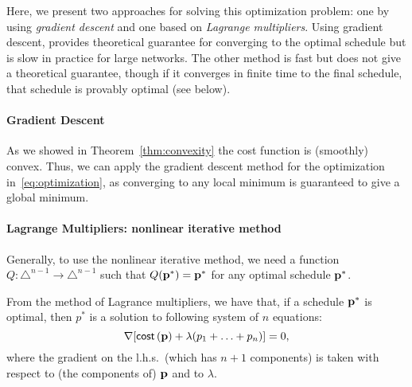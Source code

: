 Here, we present two approaches for solving this optimization problem: one by
using \emph{gradient descent} and one based on \emph{Lagrange multipliers}.
Using gradient descent, provides theoretical guarantee for converging to the
optimal schedule but is slow in practice for large networks. The other method is
fast but does not give a theoretical guarantee, though if it converges in finite
time to the final schedule, that schedule is provably optimal (see below).




\paragraph{Gradient Descent} As we showed in Theorem~\ref{thm:convexity}
the cost function is  (smoothly) convex. Thus, we can apply the gradient descent
method for the optimization in~\eqref{eq:optimization}, as converging to any
local minimum is guaranteed to give a global minimum.

\paragraph{Lagrange Multipliers: nonlinear iterative method} Generally, to use
the nonlinear iterative method, we need a function $Q:\triangle^{n-1}\rightarrow
\triangle^{n-1}$ such that $Q(\mathbf{p}^*) = \mathbf{p}^*$ for any optimal schedule $\mathbf{p}^*$.


From the method of Lagrance multipliers, we have that,
if a schedule $\mathbf{p}^*$ is optimal, then $p^*$ is a solution to following system of
$n$ equations:
\begin{equation}\label{eq:lagrange}
	\nabla [\mathsf{cost}\left( \mathbf{p} \right) + \lambda (p_1+\ldots+p_n)] = 0,
\end{equation}
where the gradient on the l.h.s.~(which has $n+1$ components) is taken with
respect to (the components of) $\mathbf{p}$ and to $\lambda$.


